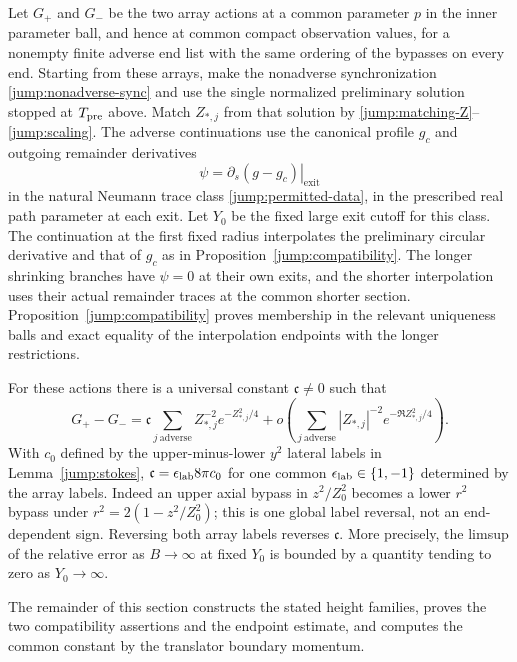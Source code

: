 \begin{proposition}\label{jump:jump}
Let $G_+$ and $G_-$ be the two array actions at a common parameter
$p$ in the inner parameter ball, and hence at common compact observation
values, for a nonempty finite adverse end list with the same ordering of
the bypasses on every end.
Starting from these arrays, make the nonadverse synchronization
\eqref{jump:nonadverse-sync} and use the single normalized preliminary
solution stopped at $T_{\rm pre}$ above.  Match $Z_{*,j}$ from that
solution by \eqref{jump:matching-Z}--\eqref{jump:scaling}.  The adverse
continuations use the canonical profile $g_c$ and outgoing remainder
derivatives
\[
 \psi=\left.\partial_s(g-g_c)\right|_{\mathrm{exit}}
\]
in the natural Neumann trace class \eqref{jump:permitted-data}, in the
prescribed real path parameter at each exit.  Let $Y_0$ be the fixed large
exit cutoff for this class.  The continuation at the first fixed radius
interpolates the preliminary circular derivative and that of $g_c$ as in
Proposition~\ref{jump:compatibility}.
The longer shrinking branches have $\psi=0$ at their own exits, and the
shorter interpolation uses their actual remainder traces at the common
shorter section.
Proposition~\ref{jump:compatibility} proves membership in the relevant
uniqueness balls and exact equality of the interpolation endpoints with
the longer restrictions.

For these actions there is a universal constant $\mathfrak c\ne0$ such
that
\begin{equation}\label{jump:action-jump}
 G_+-G_-=\mathfrak c
       \sum_{j\ \mathrm{adverse}}
       Z_{*,j}^{-2}e^{-Z_{*,j}^2/4}
       +o\left(\sum_{j\ \mathrm{adverse}}
                    |Z_{*,j}|^{-2}e^{-\Re Z_{*,j}^2/4}\right).
\end{equation}
With $c_0$ defined by the upper-minus-lower $y^2$ lateral labels in
Lemma~\ref{jump:stokes},
$\mathfrak c=\epsilon_{\rm lab}8\pi c_0$ for one common
$\epsilon_{\rm lab}\in\{1,-1\}$ determined by the array labels.
Indeed an upper axial bypass in $z^2/Z_0^2$ becomes a lower
$r^2$ bypass under $r^2=2(1-z^2/Z_0^2)$; this is one global
label reversal, not an end-dependent sign.  Reversing both
array labels reverses $\mathfrak c$.  More precisely, the
limsup of the relative error as $B\to\infty$ at fixed $Y_0$
is bounded by a quantity tending to zero as $Y_0\to\infty$.
\end{proposition}

The remainder of this section constructs the stated height families,
proves the two compatibility assertions and the endpoint estimate,
and computes the common constant by the translator boundary momentum.

